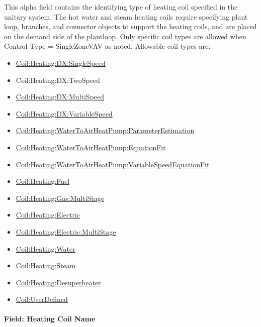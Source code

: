 This alpha field contains the identifying type of heating coil specified in the unitary system. The hot water and steam heating coils require specifying plant loop, branches, and connector objects to support the heating coils, and are placed on the demand side of the plantloop. Only specific coil types are allowed when Control Type = SingleZoneVAV as noted. Allowable coil types are:

\begin{itemize}
\item
  \hyperref[coilheatingdxsinglespeed]{Coil:Heating:DX:SingleSpeed}
\item
  Coil:Heating:DX:TwoSpeed
\item
  \hyperref[coilheatingdxmultispeed]{Coil:Heating:DX:MultiSpeed}
\item
  \hyperref[coilheatingdxvariablespeed]{Coil:Heating:DX:VariableSpeed}
\item
  \hyperref[coilheatingwatertoairheatpumpparameterestimation]{Coil:Heating:WaterToAirHeatPump:ParameterEstimation}
\item
  \hyperref[coilheatingwatertoairheatpumpequationfit]{Coil:Heating:WaterToAirHeatPump:EquationFit}
\item
  \hyperref[coilheatingwatertoairheatpumpvariablespeedequationfit]{Coil:Heating:WaterToAirHeat\hyperref[pumpvariablespeed]{Pump:VariableSpeed}EquationFit}
\item
  \hyperref[coilheatinggas-000]{Coil:Heating:Fuel}
\item
  \hyperref[coilheatinggasmultistage]{Coil:Heating:Gas:MultiStage}
\item
  \hyperref[coilheatingelectric]{Coil:Heating:Electric}
\item
  \hyperref[coilheatingelectricmultistage]{Coil:Heating:Electric:MultiStage}
\item
  \hyperref[coilheatingwater]{Coil:Heating:Water}
\item
  \hyperref[coilheatingsteam]{Coil:Heating:Steam}
\item
  \hyperref[coilheatingdesuperheater]{Coil:Heating:Desuperheater}
\item
  \hyperref[coiluserdefined]{Coil:UserDefined}
\end{itemize}

\paragraph{Field: Heating Coil Name}\label{field-heating-coil-name-002}

